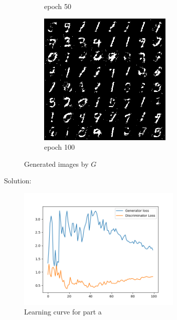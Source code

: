 \documentclass[a4paper]{article}
\theoremstyle{definition}
\newenvironment{soln}{
	\leavevmode\color{blue}\ignorespaces
}{}
\begin{document}
\begin{enumerate} [label=(\alph*)]
\begin{figure}[H]
\begin{subfigure}[b]{0.3\textwidth}
				\caption{epoch 50}
			\end{subfigure}
			\hfill
			\begin{subfigure}[b]{0.3\textwidth}
				\centering
				\includegraphics[width=\textwidth]{gan_q1_epoch100.png}
				\caption{epoch 100}
			\end{subfigure}
			\caption{Generated images by $G$}
			\label{fig:three graphs}
		\end{figure}
		
		
		\begin{soln}
			Solution:
			\begin{figure}[H]
				\centering
				\includegraphics[width=0.7\textwidth]{outputs/loss.png}
				\caption{Learning curve for part a}
				\label{fig:gan_q1_loss}
			\end{figure}
			

\end{soln}
\end{enumerate}
\end{document}
